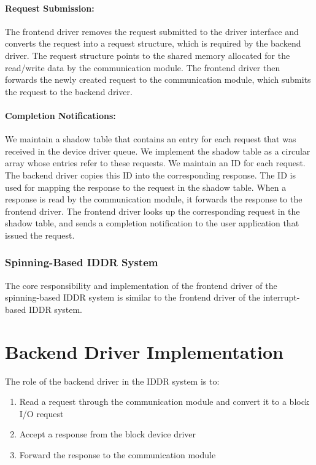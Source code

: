 \paragraph{Request Submission:}
The frontend driver removes the request submitted to the driver
interface and converts the request into a request structure, which is
required by the backend driver. The request structure points to
the shared memory allocated for the read/write data by the communication
module. The frontend driver then forwards the newly created request
to the communication module, which submits the request to the
backend driver.

\paragraph{Completion Notifications:}
We maintain a shadow table that contains an entry for each request that was 
received in the device driver queue. 
We implement the shadow table as a circular
array whose entries refer to these requests. We maintain an ID for each request. The backend
driver copies this ID into the corresponding response. The ID is used
for mapping the response to the request in the shadow table. When a
response is read by the communication module, it forwards the response
to the frontend driver. The frontend driver looks up the corresponding
request in the shadow table, and sends a completion notification to 
the user application that issued the request.

\subsubsection*{Spinning-Based IDDR System}
The core responsibility and implementation of the frontend driver of 
the spinning-based IDDR system is similar to the frontend driver of the
interrupt-based IDDR system.

\section{Backend Driver Implementation}

The role of the backend driver in the IDDR system is to:
\begin{enumerate}
\item Read a request through the communication module and convert it to a block I/O request
\item Accept a response from the block device driver
\item Forward the response to the communication module
\end{enumerate}

